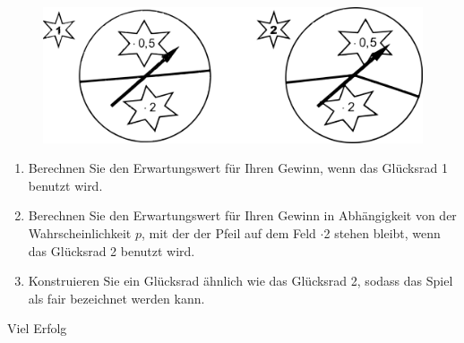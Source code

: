 \documentclass[a4paper,12pt]{article}
\begin{document}
\begin{figure}[H]
  \centering
  \includegraphics[width=0.7\columnwidth]{211203_gluecksraeder.png}
\end{figure}

\begin{enumerate}[label={\alph*)}] 
  \item Berechnen Sie den Erwartungswert für Ihren Gewinn, wenn das Glücksrad 1 benutzt wird.
  \item Berechnen Sie den Erwartungswert für Ihren Gewinn in Abhängigkeit von der Wahrscheinlichkeit $p$, mit der der Pfeil auf dem Feld $\cdot$2 stehen bleibt, wenn das Glücksrad 2 benutzt wird.
  \item Konstruieren Sie ein Glücksrad ähnlich wie das Glücksrad 2, sodass das Spiel als fair bezeichnet werden kann.
\end{enumerate}

\centerline{Viel Erfolg}
\end{document}
